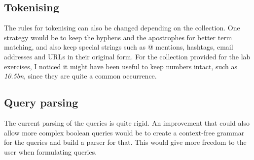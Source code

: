 \documentclass[11pt]{article}
\begin{document}
\begin{multicols}{2}
\subsection{Tokenising}
The rules for tokenising can also be changed depending on the collection. One strategy would be to keep the hyphens and the apostrophes for better term matching, and also keep special strings such as @ mentions, hashtags, email addresses and URLs in their original form. For the collection provided for the lab exercises, I noticed it might have been useful to keep numbers intact, such as \textit{10.5bn}, since they are quite a common occurrence.

\subsection{Query parsing}
The current parsing of the queries is quite rigid. An improvement that could also allow more complex boolean queries would be to create a context-free grammar for the queries and build a parser for that. This would give more freedom to the user when formulating queries.

\end{multicols}
\end{document}
